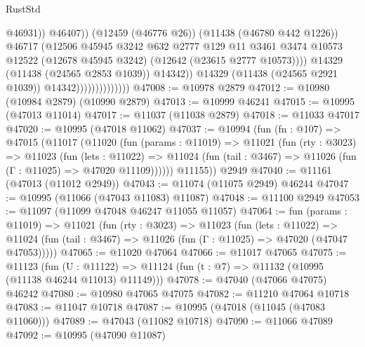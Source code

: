 \begin{lexlean}{RustStd}
\begin{coremodule}
                                              @46931))
                                          @46407))
                                      (@12459 (@46776 @26))
                                      (@11438 (@46780 @442 @1226))
                                      @46717
                                      (@12506
                                        @45945
                                        @3242
                                        @632
                                        @2777
                                        @129
                                        @11
                                        @3461
                                        @3474
                                        @10573
                                        @12522
                                        (@12678 @45945 @3242)
                                        (@12642 (@23615 @2777 @10573))))
                                    @14329
                                    (@11438 (@24565 @2853 @1039))
                                    @14342))
                                @14329
                                (@11438 (@24565 @2921 @1039))
                                @14342))))))))))))))
@47008 := @10978 @2879
@47012 := @10980 (@10984 @2879) (@10990 @2879)
@47013 := @10999 @46241
@47015 := @10995 (@47013 @11014)
@47017 := @11037 (@11038 @2879)
@47018 := @11033 @47017
@47020 := @10995 (@47018 @11062)
@47037 := @10994
    (fun (fn : @107) =>
    @47015
      (@11017
        (@11020
          (fun (params : @11019) =>
          @11021
            (fun (rty : @3023) =>
            @11023
              (fun (lets : @11022) =>
              @11024 (fun (tail : @3467) => @11026 (fun (Γ : @11025) => @47020 @11109))))))
        @11155))
    @2949
@47040 := @11161 (@47013 (@11012 @2949))
@47043 := @11074 (@11075 @2949) @46244
@47047 := @10995 (@11066 (@47043 @11083) @11087)
@47048 := @11100 @2949
@47053 := @11097 (@11099 @47048 @46247 @11055 @11057)
@47064 := fun (params : @11019) =>
  @11021
    (fun (rty : @3023) =>
    @11023
      (fun (lets : @11022) =>
      @11024 (fun (tail : @3467) => @11026 (fun (Γ : @11025) => @47020 (@47047 @47053)))))
@47065 := @11020 @47064
@47066 := @11017 @47065
@47075 := @11123
    (fun (U : @11122) => @11124 (fun (t : @7) => @11132 (@10995 (@11138 @46244 @11013) @11149)))
@47078 := @47040 (@47066 @47075) @46242
@47080 := @10980 @47065 @47075
@47082 := @11210 @47064 @10718
@47083 := @11047 @10718
@47087 := @10995 (@47018 (@11045 (@47083 @11060)))
@47089 := @47043 (@11082 @10718)
@47090 := @11066 @47089
@47092 := @10995 (@47090 @11087)

\end{coremodule}
\end{lexlean}
